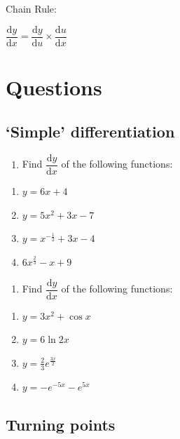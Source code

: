 \documentclass[
]{book}
\providecommand{\tightlist}{%
  \setlength{\itemsep}{0pt}\setlength{\parskip}{0pt}}
\begin{document}
Chain Rule:

\(\dfrac{\textrm{d}y}{\textrm{d}x}=\dfrac{\textrm{d}y}{\textrm{d}u} \times \dfrac{\textrm{d}u}{\textrm{d}x}\)

\hypertarget{sec:Questions4}{%
\section{Questions}\label{sec:Questions4}}

\hypertarget{simple-differentiation}{%
\subsection{`Simple' differentiation}\label{simple-differentiation}}

\begin{enumerate}
\def\labelenumi{\arabic{enumi}.}
\tightlist
\item
  Find \(\dfrac{\textrm{d}y}{\textrm{d}x}\) of the following functions:
\end{enumerate}

\begin{enumerate}
\def\labelenumi{\alph{enumi}.}
\tightlist
\item
  \(y = 6x + 4\)
\item
  \(y = 5x^2+ 3x-7\)
\item
  \(y = x^{-\frac{1}{2}}+ 3x-4\)
\item
  \(6x^{\frac{2}{3}}-x+9\)
\end{enumerate}

\begin{enumerate}
\def\labelenumi{\arabic{enumi}.}
\setcounter{enumi}{1}
\tightlist
\item
  Find \(\dfrac{\textrm{d}y}{\textrm{d}x}\) of the following functions:
\end{enumerate}

\begin{enumerate}
\def\labelenumi{\alph{enumi}.}
\tightlist
\item
  \(y = 3x^2 + \cos x\)
\item
  \(y = 6 \ln 2x\)
\item
  \(y = \frac{2}{3}e^{\frac{3x}{2}}\)
\item
  \(y = -e^{-5x}-e^{5x}\)
\end{enumerate}

\hypertarget{turning-points}{%
\subsection{Turning points}\label{turning-points}}
\end{document}
